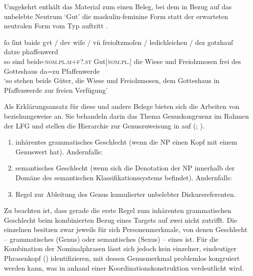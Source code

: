 Umgekehrt enthält das Material zum \CAO{} einen Beleg, bei dem in
Bezug auf das un\-belebte Neutrum  `Gut' die maskulin-feminine
Form  statt der erwarteten neutralen Form vom Typ 
auftritt .

\begin{exe}
\ex\label{ex:1584_gut2}
	\gll ſo ſint baide gvt / dev wiſe / vn̄ freioltzmoſen /
			ledichleichen / dez gotzhauſ datze phaffenwerd \\
		so sind beide-\textsc{nom.pl.m+f?\subI.st} Gut[\textsc{nom.pl.\NeutI}]
			{} die Wiese {} und Freiolzmosen {} frei {} des Gotteshaus da=zu
			Pfaffenwerde \\
	\trans `so stehen beide Güter, die Wiese und Freiolzmosen, dem Gotteshaus
		in Pfaffenwerde zur freien Verfügung'
		\parencites(Nr.~1584, Kl.~Herrenchiemsee, Kr.~Rosenheim, 1292)[727,26--27]{cao2}
\end{exe}

Als Erklärungsansatz für diese und andere Belege bieten sich die Arbeiten
von \citet[171--195]{wechslerzlatic2003} beziehungsweise \citet{wechsler2009}
an. Sie behandeln darin das Thema Genus\-kongruenz im Rahmen der LFG
\autocites(vgl.~){bresnanetal2016} und stellen die
Hierarchie zur Genuszuweisung in  auf (; \cites[584]{wechsler2009}[195]{wechslerzlatic2003}).

\begin{exe}
\ex\label{ex:gendasshier}
	\begin{enumerate}[noitemsep]
		\item inhärentes grammatisches Geschlecht (wenn die NP einen Kopf
			mit einem Genuswert hat). Andernfalls:
		\item semantisches Geschlecht (wenn sich die Denotation der NP
			innerhalb der Domäne des semantischen Klassifikationssystems
			befindet). Andernfalls:
		\item Regel zur Ableitung des Genus kumulierter unbelebter 
			Diskursreferenten.
	\end{enumerate}
\end{exe}

Zu beachten ist, dass gerade die erste Regel zum inhärenten grammatischen
Geschlecht beim kombinierten Bezug eines Targets auf zwei 
nicht zutrifft. Die einzelnen  besitzen zwar jeweils für sich
Personenmerkmale, von denen Geschlecht -- grammatisches (Genus) oder
semantisches (Sexus) -- eines ist. Für die Kombination der Nominalphrasen lässt
sich jedoch kein einzelner, eindeutiger Phrasenkopf ()
identifizieren, mit dessen Genusmerkmal problemlos kongruiert
werden kann, was in  anhand einer
Koordinations\-konstruktion verdeutlicht wird.

